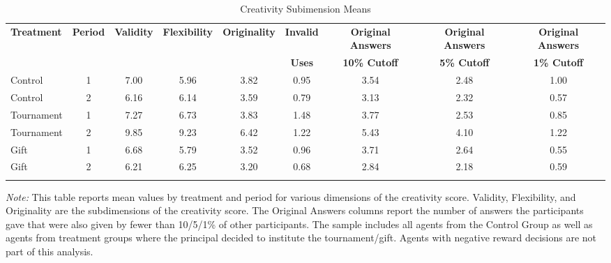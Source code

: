 \begin{landscape}
\begin{table}[h]%
\setlength\tabcolsep{2pt}\caption{Creativity Subimension Means}
\label{CreativityDimensionsMeans}
\begin{center}%
{\small\renewcommand{\arraystretch}{1}%
\begin{tabular}{lcccccccc}
\hline\hline\noalign{\smallskip}
 \bf Treatment & \bf Period &  \bf Validity & \bf Flexibility & \bf Originality & \bf Invalid & \bf Original Answers & \bf Original Answers & \bf Original Answers \\
                               &                       &                               &                                       &                               & \bf Uses      & \bf 10\% Cutoff & \bf 5\% Cutoff & \bf 1\% Cutoff \\
\hline
\noalign{\smallskip}
Control & 1 & 7.00 & 5.96 & 3.82 & 0.95 & 3.54 & 2.48 & 1.00 \\
Control & 2 & 6.16 & 6.14 & 3.59 & 0.79 & 3.13 & 2.32 & 0.57 \\
Tournament & 1 & 7.27 & 6.73 & 3.83 & 1.48 & 3.77 & 2.53 & 0.85 \\
Tournament & 2 & 9.85 & 9.23 & 6.42 & 1.22 & 5.43 & 4.10 & 1.22 \\
Gift & 1 & 6.68 & 5.79 & 3.52 & 0.96 & 3.71 & 2.64 & 0.55 \\
Gift & 2 & 6.21 & 6.25 & 3.20 & 0.68 & 2.84 & 2.18 & 0.59 \\
\hline\hline\noalign{\medskip}
\end{tabular}}
\begin{minipage}{1.4\textwidth}
\footnotesize {\it Note:} This table reports mean values by treatment and period for various dimensions of the creativity score.
Validity, Flexibility, and Originality are the subdimensions of the creativity score. 
The Original Answers columns report the number of answers the participants gave that were also given by fewer than 10/5/1\% of other participants. 
The sample includes all agents from the Control Group as well as agents from treatment groups where the principal decided to institute the tournament/gift. Agents with negative reward decisions are not part of this analysis. 
\end{minipage}
\end{center}
\end{table}
\end{landscape}

